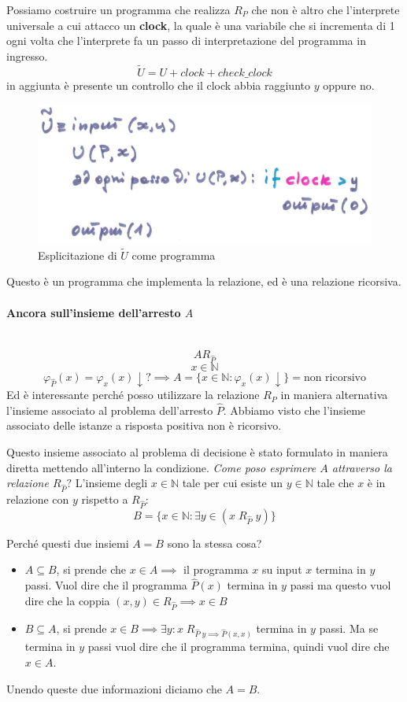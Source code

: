 \documentclass{article}
\begin{document}
Possiamo costruire un programma che realizza $R_P$ che non è altro che l'interprete universale
a cui attacco un \textbf{clock}, la quale è una variabile che si incrementa di 1
ogni volta che l'interprete fa un passo di interpretazione del programma in ingresso.
$$\tilde{U}=U+clock+check\_clock$$
in aggiunta è presente un controllo che il clock abbia raggiunto $y$ oppure no.

\begin{figure}[H]
    \centering
    \includegraphics[scale=0.5]{images/tilde_U.png}
    \caption{Esplicitazione di $\tilde{U}$ come programma}
\end{figure}
Questo è un programma che implementa la relazione, ed è una relazione ricorsiva.

\paragraph{Ancora sull'insieme dell'arresto $A$}\mbox{}\\
$$AR_{\hat{P}}$$
$$x\in\mathbb{N}$$
$$\varphi_{\hat{P}}(x)=\varphi_x(x)\downarrow?\implies A=\{x\in\mathbb{N}:\varphi_x(x)\downarrow\}=\text{non ricorsivo}$$
Ed è interessante perché posso utilizzare la relazione $R_P$ in maniera alternativa
l'insieme associato al problema dell'arresto $\hat{P}$. Abbiamo visto che
l'insieme associato delle istanze a risposta positiva non è ricorsivo.

Questo insieme associato al problema di decisione è stato formulato in maniera diretta mettendo
all'interno la condizione. \textit{Come poso esprimere $A$ attraverso
    la relazione $R_{\hat{P}}?$}
L'insieme degli $x\in\mathbb{N}$ tale per cui esiste un $y\in\mathbb{N}$ tale che
$x$ è in relazione con $y$ rispetto a $R_{\hat{P}}$:
$$B=\{x\in\mathbb{N}:\exists y\in(x\;R_{\hat{P}}\;y)\}$$

Perché questi due insiemi $A=B$ sono la stessa cosa?
\begin{itemize}
    \item $A\subseteq B$, si prende che $x\in A\implies$ il programma $x$ su input $x$
          termina in $y$ passi. Vuol dire che il programma $\hat{P}(x)$ termina in $y$ passi
          ma questo vuol dire che la coppia $(x,y)\in R_{\hat{P}}\implies x\in B$

    \item $B\subseteq A$, si prende $x\in B\implies\exists y:x\;R_{\hat{P}\;y\implies\hat{P}(x,x)}$
          termina in $y$ passi. Ma se termina in $y$ passi vuol dire che il programma termina, quindi
          vuol dire che $x\in A$.
\end{itemize}
Unendo queste due informazioni diciamo che $A=B$.
\end{document}
